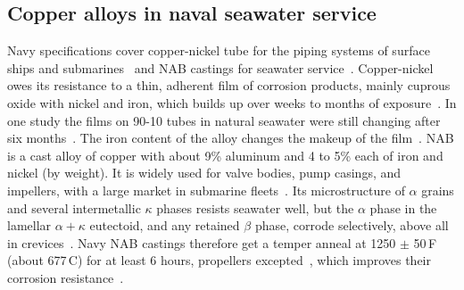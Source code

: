 \documentclass[12pt,letterpaper]{article}
\begin{document}
\subsection{Copper alloys in naval seawater service}
\label{sec:naval-cu}

Navy specifications cover copper-nickel tube for the piping systems of
surface ships and submarines~\cite{milt16420} and NAB castings for seawater
service~\cite{milb24480}. Copper-nickel owes its resistance to a thin,
adherent film of corrosion products, mainly cuprous oxide with nickel and
iron, which builds up over weeks to months of exposure~\cite{ma2015}. In one
study the films on 90-10 tubes in natural seawater were still changing after
six months~\cite{ekerenam2018}. The iron content of the alloy changes the
makeup of the film~\cite{zhu2021}. NAB is a cast alloy of copper with about
9\% aluminum and 4 to 5\% each of iron and nickel (by weight). It is widely
used for valve bodies, pump casings, and impellers, with a large market in
submarine fleets~\cite{cda222}. Its microstructure of $\alpha$ grains and several
intermetallic $\kappa$ phases resists seawater well, but the $\alpha$ phase
in the lamellar $\alpha+\kappa$ eutectoid, and any retained $\beta$ phase,
corrode selectively, above all in crevices~\cite{wharton2005,culpan1979}.
Navy NAB castings therefore get a temper anneal at 1250 $\pm$
50\,\textdegree{}F (about 677\,\textdegree{}C) for at least 6 hours,
propellers excepted~\cite{milb24480}, which improves their corrosion
resistance~\cite{cda222}.
\end{document}

